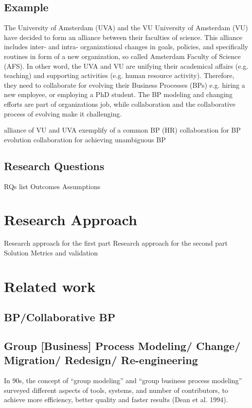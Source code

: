 \documentclass{article}
\begin{document}
 \subsection{Example}
 The University of Amsterdam (UVA) and the VU University of Amsterdam (VU) have decided to form an alliance between their faculties of science. This alliance includes inter- and intra- organizational changes in goals, policies, and specifically routines in form of a new organization, so called Amsterdam Faculty of Science (AFS). In other word, the UVA and VU are unifying their academical affairs (e.g. teaching) and supporting activities (e.g. human resource activity). Therefore, they need to collaborate for evolving their Business Processes (BPs) e.g. hiring a new employee, or employing a PhD student.
 The BP modeling and changing efforts are part of organizations job, while collaboration and the collaborative process of evolving make it challenging.
 
  alliance of  VU and UVA
 exemplify of  a common BP (HR)
 collaboration for BP evolution
 collaboration for achieving unambiguous BP
 \subsection{Research Questions}
 RQs list
 Outcomes
 Assumptions

\section{Research Approach}\label{sec:approach}

Research approach for the first part
Research approach for the second part
Solution
Metrics and validation 

\section{Related work}\label{sec:RW}
\subsection{BP/Collaborative BP}

\subsection{Group [Business]  Process Modeling/ Change/ Migration/ Redesign/ Re-engineering}\label{GM)}
In 90s, the concept of “group modeling” and “group business process modeling” surveyed different aspects of tools, systems, and number of contributors, to achieve more efficiency, better quality and faster results (Dean et al. 1994).
\end{document}
